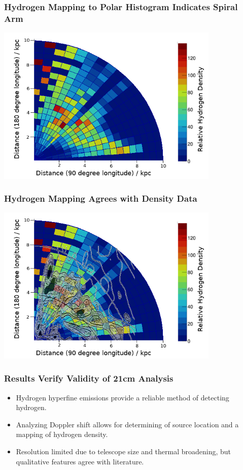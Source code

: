 \documentclass{beamer}
\begin{document}
\begin{frame}
  \frametitle{Hydrogen Mapping to Polar Histogram Indicates Spiral Arm}
  \includegraphics[width=0.8\textwidth]{final.png}
\end{frame}

\begin{frame}
  \frametitle{Hydrogen Mapping Agrees with Density Data}
  \includegraphics[width=0.8\textwidth]{final_wester.png}
\end{frame}

\begin{frame}
  \frametitle{Results Verify Validity of 21cm Analysis}
  \begin{itemize}
    \item Hydrogen hyperfine emissions provide a reliable method of detecting hydrogen.
      \pause
    \item Analyzing Doppler shift allows for determining of source location and a mapping of hydrogen density.
      \pause
    \item Resolution limited due to telescope size and thermal broadening, but qualitative features agree with literature.
  \end{itemize}
\end{frame}
\end{document}
